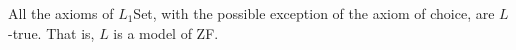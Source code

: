 All the axioms of $L_1$Set, with the possible exception of the axiom of choice, are $L$-true. That is, $L$ is a model of ZF.